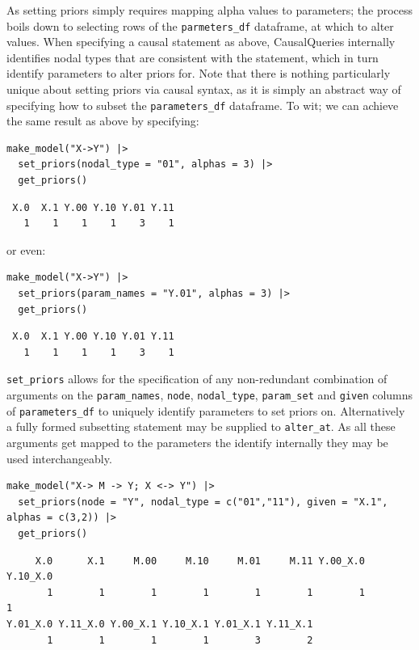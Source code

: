 \documentclass[
  article]{jss}
\begin{document}
As setting priors simply requires mapping alpha values to parameters;
the process boils down to selecting rows of the \texttt{parmeters\_df}
dataframe, at which to alter values. When specifying a causal statement
as above, CausalQueries internally identifies nodal types that are
consistent with the statement, which in turn identify parameters to
alter priors for. Note that there is nothing particularly unique about
setting priors via causal syntax, as it is simply an abstract way of
specifying how to subset the \texttt{parameters\_df} dataframe. To wit;
we can achieve the same result as above by specifying:

\begin{verbatim}
make_model("X->Y") |>
  set_priors(nodal_type = "01", alphas = 3) |>
  get_priors()
\end{verbatim}

\begin{verbatim}
 X.0  X.1 Y.00 Y.10 Y.01 Y.11 
   1    1    1    1    3    1 
\end{verbatim}

or even:

\begin{verbatim}
make_model("X->Y") |>
  set_priors(param_names = "Y.01", alphas = 3) |>
  get_priors()
\end{verbatim}

\begin{verbatim}
 X.0  X.1 Y.00 Y.10 Y.01 Y.11 
   1    1    1    1    3    1 
\end{verbatim}

\texttt{set\_priors} allows for the specification of any non-redundant
combination of arguments on the \texttt{param\_names}, \texttt{node},
\texttt{nodal\_type}, \texttt{param\_set} and \texttt{given} columns of
\texttt{parameters\_df} to uniquely identify parameters to set priors
on. Alternatively a fully formed subsetting statement may be supplied to
\texttt{alter\_at}. As all these arguments get mapped to the parameters
the identify internally they may be used interchangeably.

\begin{verbatim}
make_model("X-> M -> Y; X <-> Y") |>
  set_priors(node = "Y", nodal_type = c("01","11"), given = "X.1", alphas = c(3,2)) |>
  get_priors()
\end{verbatim}

\begin{verbatim}
     X.0      X.1     M.00     M.10     M.01     M.11 Y.00_X.0 Y.10_X.0 
       1        1        1        1        1        1        1        1 
Y.01_X.0 Y.11_X.0 Y.00_X.1 Y.10_X.1 Y.01_X.1 Y.11_X.1 
       1        1        1        1        3        2 
\end{verbatim}
\end{document}
